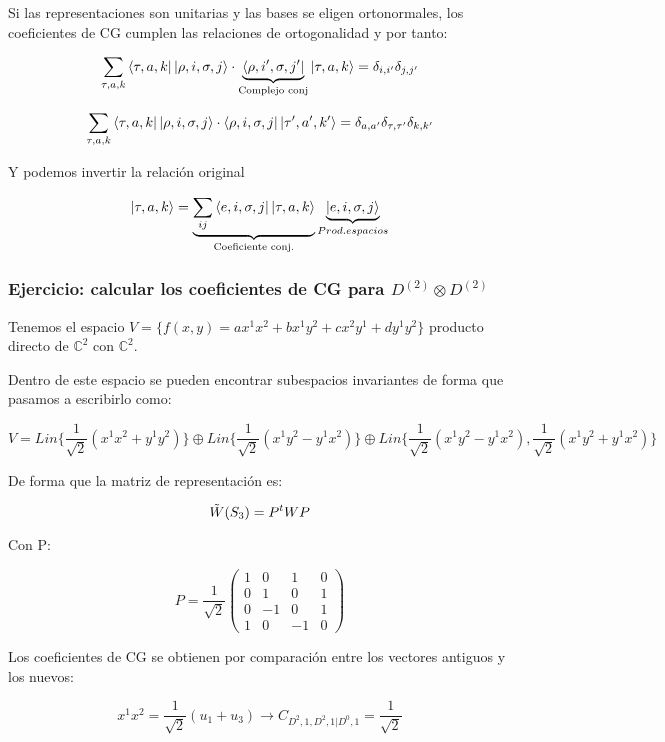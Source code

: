 \smallskip

Si las representaciones son unitarias y las bases se eligen ortonormales, los coeficientes de CG cumplen las relaciones de ortogonalidad y por tanto:


$$\sum_{\tau , a,k}\bra{\tau , a, k}\ket{\rho, i,  \sigma ,j } \cdot \underbrace{\bra{\rho, i',  \sigma ,j '}}_{\text{Complejo conj}} \ket{\tau , a, k}=\delta _{i,i'}\delta _{j,j'}$$

$$\sum_{\tau , a,k}\bra{\tau , a, k}\ket{\rho, i,  \sigma ,j } \cdot {\bra{\rho, i,  \sigma ,j }} \ket{\tau ' , a', k'}=\delta _{a,a'}\delta _{\tau,\tau '}\delta _{k, k'}$$


Y podemos invertir la relación original

$$\ket{\tau, a, k}=\underbrace{\sum _{ij} \bra{e,i, \sigma , j} \ket{ \tau , a ,k}}_{\text{Coeficiente conj.}} \underbrace{\ket{e,i,\sigma ,j}}_{Prod. espacios}$$

\subsubsection{Ejercicio: calcular los coeficientes de CG para $D^{(2)}\otimes D^{(2)}$}

Tenemos el espacio $V=\lbrace f(x,y)=ax^1x^2 + bx^1y^2 + c x^2y^1 +d y^1y^2\rbrace$ producto directo de $\mathds{C}^2$ con $\mathds{C}^2$.


Dentro de este espacio se pueden encontrar subespacios invariantes de forma que pasamos a escribirlo como:


$$V=Lin \lbrace \frac{1}{\sqrt{2}} (x^1x^2 + y^1y^2) \rbrace \oplus Lin \lbrace \frac{1}{\sqrt{2}}(x^1y^2 - y^1x^2)\rbrace \oplus Lin \lbrace \frac{1}{\sqrt{2}}(x^1y^2 - y^1x^2), \frac{1}{\sqrt{2}}(x^1y^2 + y^1x^2) \rbrace$$


De forma que la matriz de representación es:

$$\Tilde{W}(S_3)=P^tWP$$

Con P:

$$P=\frac{1}{\sqrt{2}}\left (\begin{array}{cccc}
1 & 0 & 1 & 0  \\
0 & 1 & 0 & 1  \\
0 & -1 & 0 & 1  \\
1 & 0 & -1 & 0
\end{array} \right)$$


Los coeficientes de CG se obtienen por comparación entre los vectores antiguos y los nuevos:

$$x^1x^2=\frac{1}{\sqrt{2}}(u_1+u_3) \to C_{D^2,1,D^2,1| D^0, 1}=\frac{1}{\sqrt{2}}$$

